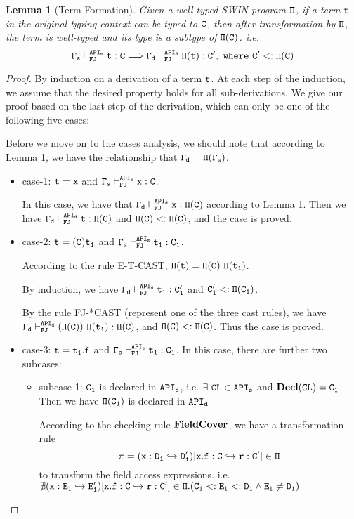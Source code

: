 \documentclass[letterpaper]{article}
\newcommand{\env}[2]{\vdash_{#1}^{#2}}
\newtheorem{lemma}{Lemma}
\begin{document}
\begin{lemma}[Term Formation]
Given a well-typed SWIN program $\tt \Pi$, if a term $\tt t$ in the original typing context can be typed to $\tt C$, then after transformation by $\tt \Pi$, the term is well-typed and its type is a subtype of $\tt \Pi(C)$. i.e.
$$\tt \Gamma_s\vdash^{API_s}_{FJ} t:C \Longrightarrow \Gamma_d\vdash^{API_d}_{FJ} \Pi(t):C',\ where\ C'<:\Pi(C)$$
\end{lemma}
\begin{proof}
By induction on a derivation of a term $\tt t$. At each step of the induction, we assume that the desired property holds for all sub-derivations. We give our proof based on the last step of the derivation, which can only be one of the following five cases:

Before we move on to the cases analysis, we should note that according to Lemma 1, we have the relationship that $\tt\Gamma_d=\Pi(\Gamma_s)$.

\begin{itemize}
\item case-1: $\tt t=x$ and $\tt\Gamma_s\env{FJ}{API_s} x:C$.

In this case, we have that $\tt\Gamma_d\env{FJ}{API_d} x:\Pi(C)$ according to Lemma 1. Then we have $\tt\Gamma_d\env{FJ}{API_d}t:\Pi(C)$ and $\tt \Pi(C)<:\Pi(C)$, and the case is proved.

\item case-2: $\tt t=(C) t_1$ and $\tt \Gamma_s\env{FJ}{API_s}t_1:C_1$.

According to the rule E-T-CAST, $\tt \Pi(t) = \Pi(C)~\Pi(t_1)$.

By induction, we have $\tt\Gamma_d\env{FJ}{API_d}t_1:C'_1$ and $\tt C'_1 <: \Pi(C_1)$.

By the rule FJ-*CAST (represent one of the three cast rules), we have $\tt \Gamma_d\env{FJ}{API_d} (\Pi(C))~\Pi(t_1) : \Pi(C)$, and $\tt\Pi(C)<:\Pi(C)$. Thus the case is proved. 

\item case-3: $\tt t=t_1.f$ and $\tt \Gamma_s\env{FJ}{API_s}t_1:C_1$. In this case, there are further two subcases:
  \begin{itemize}
    \item subcase-1: $\tt C_1$ is declared in $\tt API_s$, i.e. $\tt\exists~CL\in API_s$ and $\tt\mathbf{Decl}(CL)=C_1$. Then we have $\tt \Pi(C_1)$ is declared in $\tt API_d$

      According to the checking rule $\tt \mathbf{FieldCover}$, we have a transformation rule $$\tt \pi=(x:D_1\hookrightarrow D'_1)[x.f:C\hookrightarrow r:C']\in\Pi$$ to transform the field access expressions. i.e. $\tt \nexists (x:E_1\hookrightarrow E'_1)[x.f:C\hookrightarrow r:C']\in\Pi.(C_1<:E_1 <: D_1 \land E_1\neq D_1)$ 


\end{itemize}
\end{itemize}
\end{proof}
\end{document}
